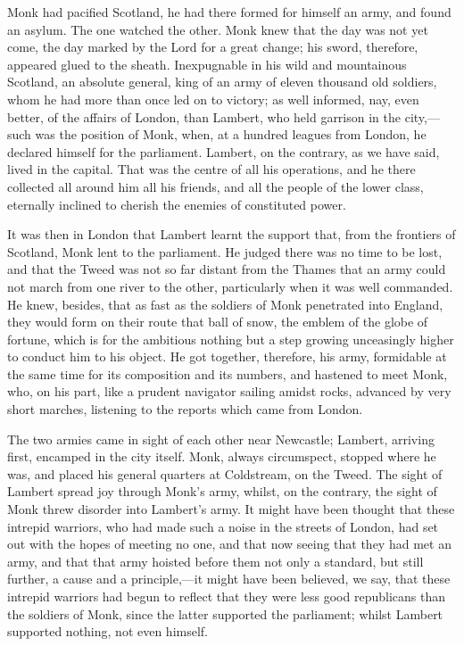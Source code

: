 Monk had pacified Scotland, he had there formed for himself an army, and found an asylum. The one watched the other. Monk knew that the day was not yet come, the day marked by the Lord for a great change; his sword, therefore, appeared glued to the sheath. Inexpugnable in his wild and mountainous Scotland, an absolute general, king of an army of eleven thousand old soldiers, whom he had more than once led on to victory; as well informed, nay, even better, of the affairs of London, than Lambert, who held garrison in the city,—such was the position of Monk, when, at a hundred leagues from London, he declared himself for the parliament. Lambert, on the contrary, as we have said, lived in the capital. That was the centre of all his operations, and he there collected all around him all his friends, and all the people of the lower class, eternally inclined to cherish the enemies of constituted power.

It was then in London that Lambert learnt the support that, from the frontiers of Scotland, Monk lent to the parliament. He judged there was no time to be lost, and that the Tweed was not so far distant from the Thames that an army could not march from one river to the other, particularly when it was well commanded. He knew, besides, that as fast as the soldiers of Monk penetrated into England, they would form on their route that ball of snow, the emblem of the globe of fortune, which is for the ambitious nothing but a step growing unceasingly higher to conduct him to his object. He got together, therefore, his army, formidable at the same time for its composition and its numbers, and hastened to meet Monk, who, on his part, like a prudent navigator sailing amidst rocks, advanced by very short marches, listening to the reports which came from London.

The two armies came in sight of each other near Newcastle; Lambert, arriving first, encamped in the city itself. Monk, always circumspect, stopped where he was, and placed his general quarters at Coldstream, on the Tweed. The sight of Lambert spread joy through Monk's army, whilst, on the contrary, the sight of Monk threw disorder into Lambert's army. It might have been thought that these intrepid warriors, who had made such a noise in the streets of London, had set out with the hopes of meeting no one, and that now seeing that they had met an army, and that that army hoisted before them not only a standard, but still further, a cause and a principle,—it might have been believed, we say, that these intrepid warriors had begun to reflect that they were less good republicans than the soldiers of Monk, since the latter supported the parliament; whilst Lambert supported nothing, not even himself.

